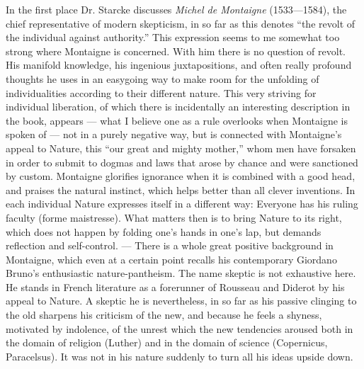 \documentclass[12pt,a4paper,openany]{book}
\newcommand{\opage}[1]{\marginnote{\footnotesize\textit{[#1]}}}
\begin{document}
In the first place Dr. Starcke discusses \emph{Michel de Montaigne}
(1533---1584), the chief representative of modern
skepticism, in so far as this denotes ``the revolt of the individual against
authority.'' This expression seems to me somewhat too strong
where Montaigne is concerned. With him there is no question
of revolt. His manifold knowledge, his ingenious
juxtapositions, and often really profound thoughts he uses
in an easygoing way to make room for the unfolding
of individualities according to their different nature. This very
striving for individual liberation, of which there is
incidentally an interesting description in the book, appears
--- what I believe one as a rule overlooks when Montaigne
is spoken of --- not in a purely negative way, but is connected
with Montaigne's appeal to Nature, this ``our great
and mighty mother,'' whom men have forsaken in order to
submit to dogmas and laws that arose by chance and were sanctioned by
custom. Montaigne glorifies ignorance when
it is combined with a good head, and praises the natural
instinct, which helps better than all clever
inventions. In each individual Nature expresses itself in a different way: Everyone
has his ruling faculty (forme maistresse). What matters then is
to bring Nature to its right, which does not happen by
folding one's hands in one's lap, but demands reflection and
self-control. --- There is a whole great positive background in
Montaigne, which even at a certain point recalls his
contemporary Giordano Bruno's enthusiastic nature-pantheism.
The name skeptic is not exhaustive here. He stands in
\opage{20}French literature as a forerunner of Rousseau and Diderot by
his appeal to Nature. A skeptic he is nevertheless, in so far as
his passive clinging to the old sharpens his criticism
of the new, and because he feels a shyness, motivated by indolence,
of the unrest which the new tendencies aroused both
in the domain of religion (Luther) and in the domain of
science (Copernicus, Paracelsus). It was not in his
nature suddenly to turn all his ideas
upside down.
\end{document}
